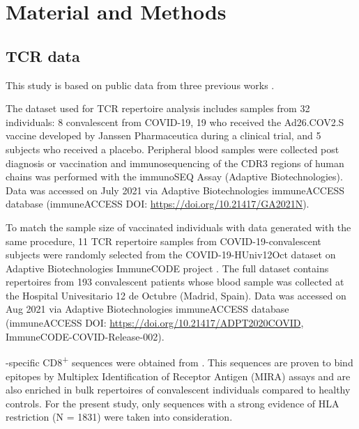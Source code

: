 \chapter*{Material and Methods}
\label{chap:matmed}


\section*{TCR data}

This study is based on public data from three previous works \citep{janssen, immunecode, metaclonotypes}.

The dataset used for TCR repertoire analysis \citep{janssen} includes samples from 32 individuals: 8 convalescent from COVID-19, 19 who received the Ad26.COV2.S vaccine developed by Janssen Pharmaceutica during a clinical trial, and 5 subjects who received a placebo. Peripheral blood samples were collected post diagnosis or vaccination and immunosequencing of the CDR3 regions of human \TCRB{} chains was performed with the immunoSEQ Assay (Adaptive Biotechnologies). Data was accessed on July 2021 via Adaptive Biotechnologies immuneACCESS\textregistered{} database (immuneACCESS\textregistered{} DOI: \url{https://doi.org/10.21417/GA2021N}).

To match the sample size of vaccinated individuals with data generated with the same procedure, 11 TCR repertoire samples from COVID-19-convalescent subjects were randomly selected from the COVID-19-HUniv12Oct dataset on Adaptive Biotechnologies ImmuneCODE\texttrademark{} project \citep{immunecode}. The full dataset contains \TCRB{} repertoires from 193 convalescent patients whose blood sample was collected at the Hospital Univesitario 12 de Octubre (Madrid, Spain). Data was accessed on Aug 2021 via Adaptive Biotechnologies immuneACCESS\textregistered{} database (immuneACCESS\textregistered{} DOI: \url{https://doi.org/10.21417/ADPT2020COVID}, ImmuneCODE-COVID-Release-002).


\covid-specific CD8\textsuperscript{+} \TCRB{} sequences were obtained from \cite{metaclonotypes}. This sequences are proven to bind \covid{} epitopes by Multiplex Identification of Receptor Antigen (MIRA) assays \citep{immunecode} and are also enriched in bulk \TCRB{} repertoires of convalescent individuals compared to healthy controls. For the present study, only \TCRB{} sequences with a strong evidence of HLA restriction (N = 1831) were taken into consideration.







